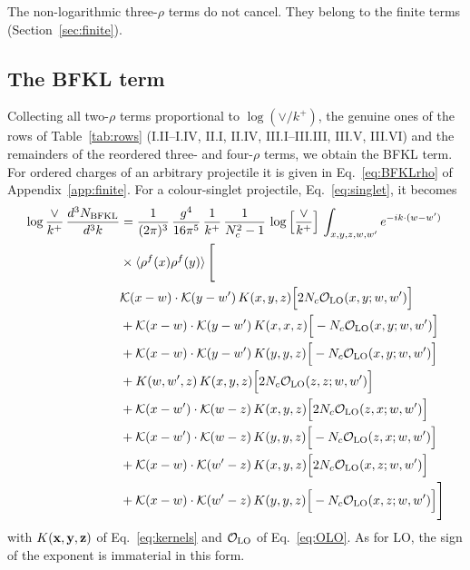 The non-logarithmic three-$\rho$ terms do not cancel. They belong to the finite terms (Section~\ref{sec:finite}).

\subsection{The BFKL term}\label{sec:BFKL}

Collecting all two-$\rho$ terms proportional to $\log(\vee/k^+)$, the genuine ones of the rows of Table~\ref{tab:rows} (I.II--I.IV, II.I, II.IV, III.I--III.III, III.V, III.VI) and the remainders of the reordered three- and four-$\rho$ terms, we obtain the BFKL term. For ordered charges of an arbitrary projectile it is given in Eq.~\eqref{eq:BFKLrho} of Appendix~\ref{app:finite}. For a colour-singlet projectile, Eq.~\eqref{eq:singlet}, it becomes
\begin{align}\label{eq:BFKLsinglet}
\log\frac{\vee}{k^+}\,\frac{d^{3}N_{\rm BFKL}}{d^{3}k} & = \frac{1}{(2\pi)^{3}}\,\frac{g^{4}}{16\pi^{5}}\,\frac{1}{k^{+}}\,\frac{1}{N^{2}_{c}-1}\,\log\Big[\frac{\vee}{k^{+}}\Big]\,\int_{x,y,z,w,w'}e^{-ik\cdot (w-w')}\notag\\&\times\langle\rho^{f}(x)\rho^{f}(y) \rangle\,\Bigg[ \notag\\ & \mathcal K(x-w)\cdot\mathcal K(y-w')\,K(x,y,z)\Big[2 N_{c}\mathcal O_{\rm LO}(x,y;w,w')\Big]\notag\\
&+\mathcal K(x-w)\cdot\mathcal K(y-w')\,K(x,x,z)\Big[-N_{c}\mathcal O_{\rm LO}(x,y;w,w')\Big]\notag\\
&+\mathcal K(x-w)\cdot\mathcal K(y-w')\,K(y,y,z)\Big[-N_{c}\mathcal O_{\rm LO}(x,y;w,w')\Big]\notag\\
&+K(w,w',z)\,K(x,y,z)\Big[2 N_{c}\mathcal O_{\rm LO}(z,z;w,w')\Big]\notag\\
&+\mathcal K(x-w')\cdot\mathcal K(w-z)\,K(x,y,z)\Big[2 N_{c}\mathcal O_{\rm LO}(z,x;w,w')\Big]\notag\\
&+\mathcal K(x-w')\cdot\mathcal K(w-z)\,K(y,y,z)\Big[-N_{c}\mathcal O_{\rm LO}(z,x;w,w')\Big]\notag\\
&+\mathcal K(x-w)\cdot\mathcal K(w'-z)\,K(x,y,z)\Big[2 N_{c}\mathcal O_{\rm LO}(x,z;w,w')\Big]\notag\\
&+\mathcal K(x-w)\cdot\mathcal K(w'-z)\,K(y,y,z)\Big[-N_{c}\mathcal O_{\rm LO}(x,z;w,w')\Big]\Bigg]
\end{align}
with $K(\mathbf{x},\mathbf{y},\mathbf{z})$ of Eq.~\eqref{eq:kernels} and $\mathcal O_{\rm LO}$ of Eq.~\eqref{eq:OLO}. As for LO, the sign of the exponent is immaterial in this form.


